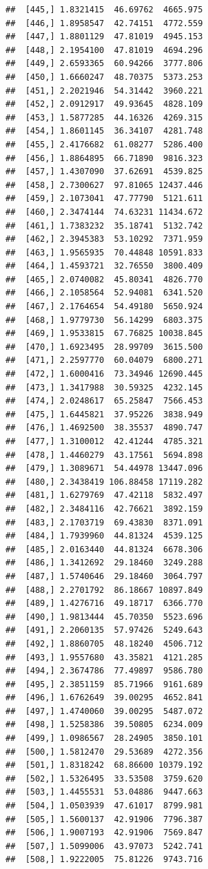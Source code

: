 \documentclass[article]{jss}\usepackage[]{graphicx}\usepackage[]{xcolor}
\makeatletter
\newenvironment{kframe}{%
 \def\at@end@of@kframe{}%
 \ifinner\ifhmode%
  \def\at@end@of@kframe{\end{minipage}}%
  \begin{minipage}{\columnwidth}%
 \fi\fi%
 \def\FrameCommand##1{\hskip\@totalleftmargin \hskip-\fboxsep
 \colorbox{shadecolor}{##1}\hskip-\fboxsep
     \hskip-\linewidth \hskip-\@totalleftmargin \hskip\columnwidth}%
 \MakeFramed {\advance\hsize-\width
   \@totalleftmargin\z@ \linewidth\hsize
   \@setminipage}}%
 {\par\unskip\endMakeFramed%
 \at@end@of@kframe}
\newenvironment{knitrout}{}{} %
\makeatother
\begin{document}
\begin{knitrout}
\begin{kframe}
\begin{verbatim}
##  [445,] 1.8321415  46.69762  4665.975
##  [446,] 1.8958547  42.74151  4772.559
##  [447,] 1.8801129  47.81019  4945.153
##  [448,] 2.1954100  47.81019  4694.296
##  [449,] 2.6593365  60.94266  3777.806
##  [450,] 1.6660247  48.70375  5373.253
##  [451,] 2.2021946  54.31442  3960.221
##  [452,] 2.0912917  49.93645  4828.109
##  [453,] 1.5877285  44.16326  4269.315
##  [454,] 1.8601145  36.34107  4281.748
##  [455,] 2.4176682  61.08277  5286.400
##  [456,] 1.8864895  66.71890  9816.323
##  [457,] 1.4307090  37.62691  4539.825
##  [458,] 2.7300627  97.81065 12437.446
##  [459,] 2.1073041  47.77790  5121.611
##  [460,] 2.3474144  74.63231 11434.672
##  [461,] 1.7383232  35.18741  5132.742
##  [462,] 2.3945383  53.10292  7371.959
##  [463,] 1.9565935  70.44848 10591.833
##  [464,] 1.4593721  32.76550  3800.409
##  [465,] 2.0740082  45.80341  4826.770
##  [466,] 2.1058564  52.94081  6341.520
##  [467,] 2.1764654  54.49180  5650.924
##  [468,] 1.9779730  56.14299  6803.375
##  [469,] 1.9533815  67.76825 10038.845
##  [470,] 1.6923495  28.99709  3615.500
##  [471,] 2.2597770  60.04079  6800.271
##  [472,] 1.6000416  73.34946 12690.445
##  [473,] 1.3417988  30.59325  4232.145
##  [474,] 2.0248617  65.25847  7566.453
##  [475,] 1.6445821  37.95226  3838.949
##  [476,] 1.4692500  38.35537  4890.747
##  [477,] 1.3100012  42.41244  4785.321
##  [478,] 1.4460279  43.17561  5694.898
##  [479,] 1.3089671  54.44978 13447.096
##  [480,] 2.3438419 106.88458 17119.282
##  [481,] 1.6279769  47.42118  5832.497
##  [482,] 2.3484116  42.76621  3892.159
##  [483,] 2.1703719  69.43830  8371.091
##  [484,] 1.7939960  44.81324  4539.125
##  [485,] 2.0163440  44.81324  6678.306
##  [486,] 1.3412692  29.18460  3249.288
##  [487,] 1.5740646  29.18460  3064.797
##  [488,] 2.2701792  86.18667 10897.849
##  [489,] 1.4276716  49.18717  6366.770
##  [490,] 1.9813444  45.70350  5523.696
##  [491,] 2.2060135  57.97426  5249.643
##  [492,] 1.8860705  48.18240  4506.712
##  [493,] 1.9557680  43.35821  4121.285
##  [494,] 2.3674786  77.49897  9586.780
##  [495,] 2.3851159  85.71966  9161.689
##  [496,] 1.6762649  39.00295  4652.841
##  [497,] 1.4740060  39.00295  5487.072
##  [498,] 1.5258386  39.50805  6234.009
##  [499,] 1.0986567  28.24905  3850.101
##  [500,] 1.5812470  29.53689  4272.356
##  [501,] 1.8318242  68.86600 10379.192
##  [502,] 1.5326495  33.53508  3759.620
##  [503,] 1.4455531  53.04886  9447.663
##  [504,] 1.0503939  47.61017  8799.981
##  [505,] 1.5600137  42.91906  7796.387
##  [506,] 1.9007193  42.91906  7569.847
##  [507,] 1.5099006  43.97073  5242.741
##  [508,] 1.9222005  75.81226  9743.716

\end{verbatim}
\end{kframe}
\end{knitrout}
\end{document}
